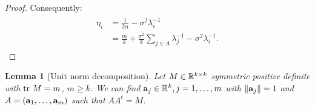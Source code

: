 \documentclass{article}
\newtheorem{lemma}{Lemma}
\begin{document}
\begin{proof}
  Consequently:
  \begin{align} \label{eq:etas}
    \begin{split}
      \eta_i &= \frac{1}{2\alpha} - \sigma^2 \lambda_i^{-1}\\
      &=\frac{m}{k} + \frac{\sigma^2}{k} \sum_{j\in A} \lambda_j^{-1} - \sigma^2 \lambda_i^{-1}.%
    \end{split}
  \end{align}
\end{proof}







\begin{lemma}[Unit norm decomposition]\label{lemma:free}
  Let $M \in \mathbb{R}^{k \times k}$ symmetric positive definite with $\textup{tr}\ M
  = m$, $m \geq k$. We can find $\mathbf{a}_j \in \mathbb{R}^k,j=1,\dots,m$
  with $\|\mathbf{a}_j\|=1$ and $A = (\mathbf{a}_1,\dots,\mathbf{a}_m)$ such that
  $AA^t = M$.
\end{lemma}
\end{document}
